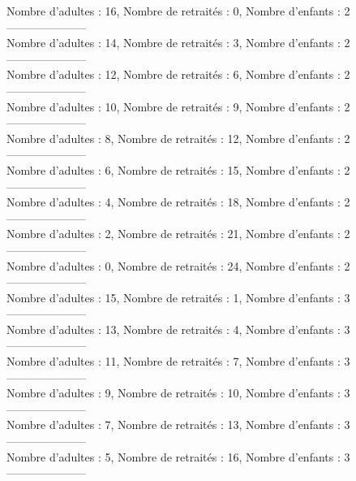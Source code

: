 \documentclass[10pt,a4paper]{article}
\begin{document}
Nombre d'adultes : 16, Nombre de retraités : 0, Nombre d'enfants : 2\\
---------------------\\
Nombre d'adultes : 14, Nombre de retraités : 3, Nombre d'enfants : 2\\
---------------------\\
Nombre d'adultes : 12, Nombre de retraités : 6, Nombre d'enfants : 2\\
---------------------\\
Nombre d'adultes : 10, Nombre de retraités : 9, Nombre d'enfants : 2\\
---------------------\\
Nombre d'adultes : 8, Nombre de retraités : 12, Nombre d'enfants : 2\\
---------------------\\
Nombre d'adultes : 6, Nombre de retraités : 15, Nombre d'enfants : 2\\
---------------------\\
Nombre d'adultes : 4, Nombre de retraités : 18, Nombre d'enfants : 2\\
---------------------\\
Nombre d'adultes : 2, Nombre de retraités : 21, Nombre d'enfants : 2\\
---------------------\\
Nombre d'adultes : 0, Nombre de retraités : 24, Nombre d'enfants : 2\\
---------------------\\
Nombre d'adultes : 15, Nombre de retraités : 1, Nombre d'enfants : 3\\
---------------------\\
Nombre d'adultes : 13, Nombre de retraités : 4, Nombre d'enfants : 3\\
---------------------\\
Nombre d'adultes : 11, Nombre de retraités : 7, Nombre d'enfants : 3\\
---------------------\\
Nombre d'adultes : 9, Nombre de retraités : 10, Nombre d'enfants : 3\\
---------------------\\
Nombre d'adultes : 7, Nombre de retraités : 13, Nombre d'enfants : 3\\
---------------------\\
Nombre d'adultes : 5, Nombre de retraités : 16, Nombre d'enfants : 3\\
---------------------\\
\end{document}
